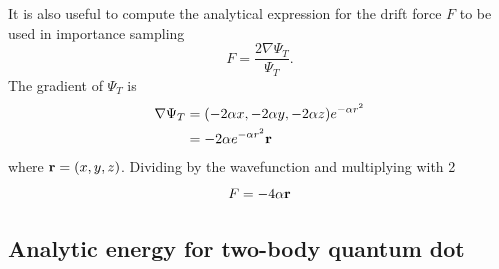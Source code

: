 \documentclass[english, a4paper]{article}
\begin{document}
\noindent It is also useful to compute the analytical expression for the drift force $F$ to be used in importance sampling
\begin{equation}
 F = \frac{2\nabla \Psi_T}{\Psi_T}.
\end{equation}
The gradient of $\Psi_T$ is
\begin{align}
 \nabla \Psi_T &= (-2\alpha x, -2\alpha y, -2\alpha z)e^{-\alpha r^2} \\
               &= -2\alpha e^{-\alpha r^2} \bf{r}
\end{align}
where ${\bf r} = (x, y, z)$.
Dividing by the wavefunction and multiplying with 2
\begin{equation}
 F = -4\alpha \bf{r}
\end{equation}


\subsection{Analytic energy for two-body quantum dot}
\end{document}
